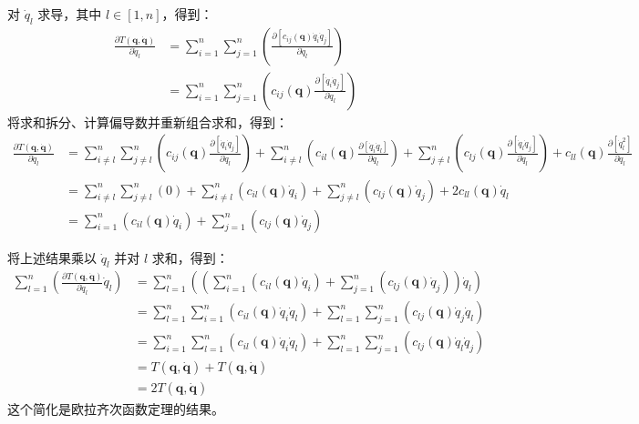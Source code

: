 对 \( \dot{q}_{l} \) 求导，其中 \( l \in [1, n] \)，得到：
\begin{equation}
\begin{aligned}
\frac{\partial T(\boldsymbol{q}, \boldsymbol{\dot{q}})}{\partial \dot{q}_{l}} &= \sum_{i=1}^{n} \sum_{j=1}^{n} \left( \frac{\partial \left[ c_{ij}(\boldsymbol{q}) \dot{q}_{i} \dot{q}_{j} \right]}{\partial \dot{q}_{l}} \right)\\ 
&= \sum_{i=1}^{n} \sum_{j=1}^{n} \left( c_{ij}(\boldsymbol{q}) \frac{\partial \left[ \dot{q}_{i} \dot{q}_{j} \right]}{\partial \dot{q}_{l}} \right)
\end{aligned}~
\end{equation}
将求和拆分、计算偏导数并重新组合求和，得到：
\begin{equation}
\begin{aligned}
\frac{\partial T(\boldsymbol{q}, \boldsymbol{\dot{q}})}{\partial \dot{q}_{l}} 
&= \sum_{i \neq l}^{n} \sum_{j \neq l}^{n} \left( c_{ij}(\boldsymbol{q}) \frac{\partial \left[\dot{q}_{i} \dot{q}_{j}\right]}{\partial \dot{q}_{l}} \right) + \sum_{i \neq l}^{n} \left( c_{il}(\boldsymbol{q}) \frac{\partial \left[\dot{q}_{i} \dot{q}_{l}\right]}{\partial \dot{q}_{l}} \right) + \sum_{j \neq l}^{n} \left( c_{lj}(\boldsymbol{q}) \frac{\partial \left[\dot{q}_{l} \dot{q}_{j}\right]}{\partial \dot{q}_{l}} \right) + c_{ll}(\boldsymbol{q}) \frac{\partial \left[\dot{q}_{l}^{2}\right]}{\partial \dot{q}_{l}}\\
&= \sum_{i \neq l}^{n} \sum_{j \neq l}^{n} (0) + \sum_{i \neq l}^{n} \left( c_{il}(\boldsymbol{q}) \dot{q}_{i} \right) + \sum_{j \neq l}^{n} \left( c_{lj}(\boldsymbol{q}) \dot{q}_{j} \right) + 2c_{ll}(\boldsymbol{q}) \dot{q}_{l}\\
&= \sum_{i=1}^{n} \left( c_{il}(\boldsymbol{q}) \dot{q}_{i} \right) + \sum_{j=1}^{n} \left( c_{lj}(\boldsymbol{q}) \dot{q}_{j} \right)
\end{aligned}~
\end{equation}

将上述结果乘以 \(\dot{q}_{l}\) 并对 \(l\) 求和，得到：
\begin{equation}
\begin{aligned}
\sum_{l=1}^{n} \left( \frac{\partial T(\boldsymbol{q}, \boldsymbol{\dot{q}})}{\partial \dot{q}_{l}} \dot{q}_{l} \right) &= \sum_{l=1}^{n} \left( \left( \sum_{i=1}^{n} \left( c_{il}(\boldsymbol{q}) \dot{q}_{i} \right) + \sum_{j=1}^{n} \left( c_{lj}(\boldsymbol{q}) \dot{q}_{j} \right) \right) \dot{q}_{l} \right)\\
&= \sum_{l=1}^{n} \sum_{i=1}^{n} \left( c_{il}(\boldsymbol{q}) \dot{q}_{i} \dot{q}_{l} \right) + \sum_{l=1}^{n} \sum_{j=1}^{n} \left( c_{lj}(\boldsymbol{q}) \dot{q}_{j} \dot{q}_{l} \right)\\
&= \sum_{i=1}^{n} \sum_{l=1}^{n} \left( c_{il}(\boldsymbol{q}) \dot{q}_{i} \dot{q}_{l} \right) + \sum_{l=1}^{n} \sum_{j=1}^{n} \left( c_{lj}(\boldsymbol{q}) \dot{q}_{l} \dot{q}_{j} \right)\\
&= T(\boldsymbol{q}, \boldsymbol{\dot{q}}) + T(\boldsymbol{q}, \boldsymbol{\dot{q}})\\
&= 2T(\boldsymbol{q}, \boldsymbol{\dot{q}})
\end{aligned}~
\end{equation}
这个简化是欧拉齐次函数定理的结果。

